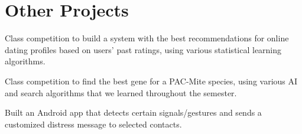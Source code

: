 \documentclass[letterpaper]{deedy-resume} %
\begin{document}

\newpage %

\begin{minipage}[t]{0.33\textwidth} %

\section{}

\end{minipage} %
\hfill
\begin{minipage}[t]{0.66\textwidth} %


\section{Other Projects}


Class competition to build a system with the best recommendations for online dating profiles based on users' past ratings, using various statistical learning algorithms.

\sectionspace %



Class competition to find the best gene for a PAC-Mite species, using various AI and search algorithms that we learned throughout the semester.

\sectionspace %



Built an Android app that detects certain signals/gestures and sends a customized distress message to selected contacts.


\end{minipage}
\end{document}

